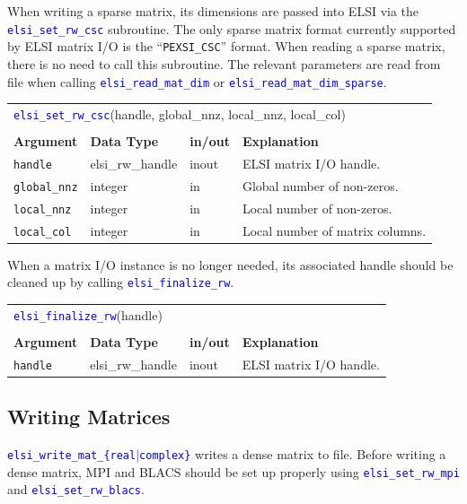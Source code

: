 \documentclass{report}
\newcommand{\api}[1]{\textcolor{blue}{\texttt{#1}}}
\begin{document}
When writing a sparse matrix, its dimensions are passed into ELSI via the \api{elsi\_set\_rw\_csc} subroutine. The only sparse matrix format currently supported by ELSI matrix I/O is the ``\texttt{PEXSI\_CSC}'' format. When reading a sparse matrix, there is no need to call this subroutine. The relevant parameters are read from file when calling \api{elsi\_read\_mat\_dim} or \api{elsi\_read\_mat\_dim\_sparse}.

\begin{tabular}[]{|p{25mm}|p{25mm}|p{10mm}|p{102mm}|}
\multicolumn{4}{l}{\api{elsi\_set\_rw\_csc}(handle, global\_nnz, local\_nnz, local\_col)}\\
\multicolumn{4}{l}{}\\
\hline
\multicolumn{1}{|l|}{\textbf{Argument}} & \multicolumn{1}{l|}{\textbf{Data Type}} & \multicolumn{1}{l|}{\textbf{in/out}} & \multicolumn{1}{l|}{\textbf{Explanation}}\\
\hline
\texttt{handle}      & elsi\_rw\_handle & inout & ELSI matrix I/O handle.\\
\hline
\texttt{global\_nnz} & integer          & in    & Global number of non-zeros.\\
\hline
\texttt{local\_nnz}  & integer          & in    & Local number of non-zeros.\\
\hline
\texttt{local\_col}  & integer          & in    & Local number of matrix columns.\\
\hline
\end{tabular}

When a matrix I/O instance is no longer needed, its associated handle should be cleaned up by calling \api{elsi\_finalize\_rw}.

\begin{tabular}[]{|p{25mm}|p{25mm}|p{10mm}|p{102mm}|}
\multicolumn{4}{l}{\api{elsi\_finalize\_rw}(handle)}\\
\multicolumn{4}{l}{}\\
\hline
\multicolumn{1}{|l|}{\textbf{Argument}} & \multicolumn{1}{l|}{\textbf{Data Type}} & \multicolumn{1}{l|}{\textbf{in/out}} & \multicolumn{1}{l|}{\textbf{Explanation}}\\
\hline
\texttt{handle} & elsi\_rw\_handle & inout & ELSI matrix I/O handle.\\
\hline
\end{tabular}

\subsection{Writing Matrices}
\label{subsec:rw_write}
\api{elsi\_write\_mat\_\{real$\vert$complex\}} writes a dense matrix to file. Before writing a dense matrix, MPI and BLACS should be set up properly using \api{elsi\_set\_rw\_mpi} and \api{elsi\_set\_rw\_blacs}.
\end{document}
